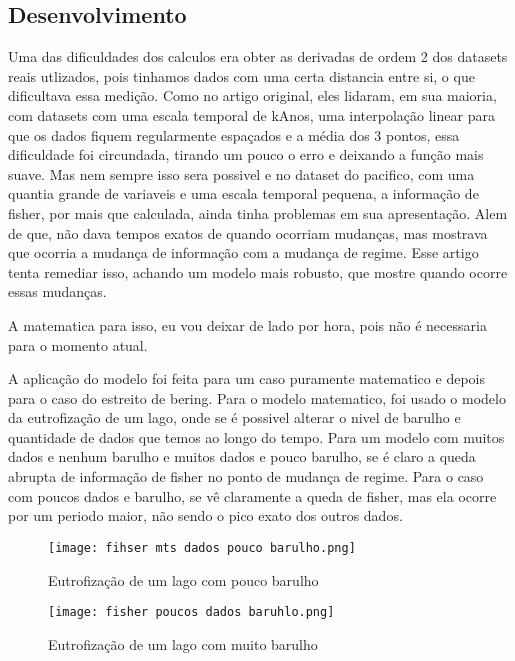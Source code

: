 \subsection{Desenvolvimento}
Uma das dificuldades dos calculos era obter as derivadas de ordem 2 dos datasets reais utlizados, pois
tinhamos dados com uma certa distancia entre si, o que dificultava essa medição. Como no artigo
original, eles lidaram, em sua maioria, com datasets com uma escala temporal de kAnos, uma
interpolação linear para que os dados fiquem regularmente espaçados e a média dos 3 pontos, essa
dificuldade foi circundada, tirando um pouco o erro e deixando a função mais suave. Mas nem sempre
isso sera possivel e no dataset do pacifico, com uma quantia grande de variaveis e uma escala
temporal pequena, a informação de fisher, por mais que calculada, ainda tinha problemas em sua
apresentação. Alem de que, não dava tempos exatos de quando ocorriam mudanças, mas mostrava que
ocorria a mudança de informação com a mudança de regime. Esse artigo tenta remediar isso, achando um
modelo mais robusto, que mostre quando ocorre essas mudanças. \par
A matematica para isso, eu vou deixar de lado por hora, pois não é necessaria para o momento atual. \par
A aplicação do modelo foi feita para um caso puramente matematico e depois para o caso do estreito
de bering. Para o modelo matematico, foi usado o modelo da eutrofização de um lago, onde se é
possivel alterar o nivel de barulho e quantidade de dados que temos ao longo do tempo. Para um
modelo com muitos dados e nenhum barulho e muitos dados e pouco barulho, se é claro a queda abrupta
de informação de fisher no ponto de mudança de regime. Para o caso com poucos dados e barulho, se vê
claramente a queda de fisher, mas ela ocorre por um periodo maior, não sendo o pico exato dos outros
dados.
\begin{figure}[H]
    \centering
    \texttt{[image: fihser mts dados pouco barulho.png]}
    \caption{Eutrofização de um lago com pouco barulho}
    \label{fig:Eutrofizacao de um lago com pouco barulho}
\end{figure}
\begin{figure}[H]
    \centering
    \texttt{[image: fisher poucos dados baruhlo.png]}
    \caption{Eutrofização de um lago com muito barulho}
    \label{fig:Eutrofizacao de um lago com muito barulho}
\end{figure}
